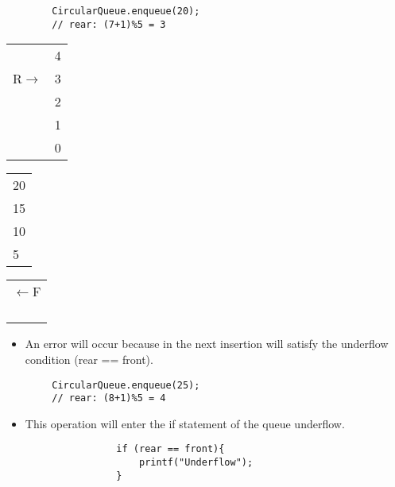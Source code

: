 \begin{center}
    \begin{verbatim}
        CircularQueue.enqueue(20);
        // rear: (7+1)%5 = 3
    \end{verbatim}

    \begin{tabular}{ cc }
        {}&{4} \\ {R$\rightarrow$}&{3} \\ {}&{2} \\ {}&{1} \\ {}&{0} \\
    \end{tabular}
    \begin{tabular}{|p{0.75cm}|}
        \hline {} \\ \hline {20} \\ \hline {15} \\ \hline {10} \\ \hline {5} \\ \hline
    \end{tabular}
    \begin{tabular}{ c }
        {$\leftarrow$F} \\ {} \\ {} \\ {} \\ {} \\
    \end{tabular}

    \begin{itemize}
        \item An error will occur because in the next insertion will satisfy the underflow condition (rear == front).
    \end{itemize}
    \begin{verbatim}
        CircularQueue.enqueue(25);
        // rear: (8+1)%5 = 4
    \end{verbatim}
    \begin{itemize}
        \item This operation will enter the if statement of the queue underflow.
            \begin{verbatim}
                if (rear == front){
                    printf("Underflow");
                }
            \end{verbatim}
        

\end{itemize}
\end{center}
